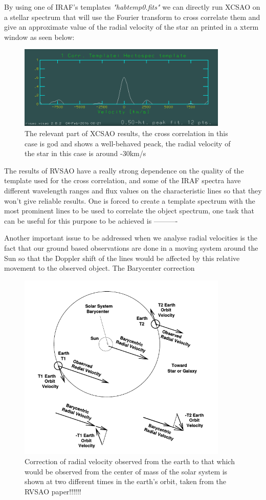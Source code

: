 By using one of IRAF's templates \textit{"habtemp0.fits"} we can directly run XCSAO on a stellar spectrum that will use the Fourier transform to cross correlate them and give an approximate value of the radial velocity of the star an printed in a xterm window as seen below: 

\begin{figure}[H]
\centering
\includegraphics[width=10cm]{images/xcsao.png}
\caption[XCSAO results]{The relevant part of XCSAO results, the cross correlation in this case is god and shows a well-behaved peack, the radial velocity of the star in this case is around -30km/s}
\end{figure}

The results of RVSAO have a really strong dependence on the quality of the template used for the cross correlation, and some of the IRAF spectra have different wavelength ranges and flux values on the characteristic lines so that they won't give reliable results. One is forced to create a template spectrum with the most prominent lines to be used to correlate the object spectrum, one task that can be useful for this purpose to be achieved is ----------   

Another important issue to be addressed when we analyse radial velocities is the fact that our ground based observations are done in a moving system around the Sun so that the Doppler shift of the lines would be affected by this relative movement to the observed object. The Barycenter correction   

\begin{figure}[H]
\centering
\includegraphics[width=10cm]{images/bcvcor.png}
\caption[The nature of the barycenter shift of radial velocities]{Correction of radial velocity observed from the earth to that which would be observed from the center of mass of the solar system is shown at two different times in the earth's orbit, taken from the RVSAO paper!!!!!!}
\end{figure}


